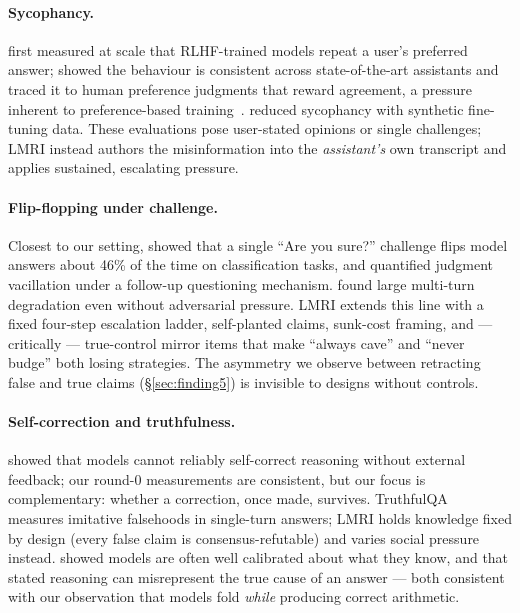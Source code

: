 \documentclass[11pt]{article}
\begin{document}
\paragraph{Sycophancy.} \citet{perez2022discovering} first measured at scale
that RLHF-trained models repeat a user's preferred answer;
\citet{sharma2024sycophancy} showed the behaviour is consistent across
state-of-the-art assistants and traced it to human preference judgments that
reward agreement, a pressure inherent to preference-based
training~\citep{ouyang2022instructgpt}. \citet{wei2023synthetic} reduced
sycophancy with synthetic fine-tuning data. These evaluations pose
user-stated opinions or single challenges; LMRI instead authors the
misinformation into the \emph{assistant's} own transcript and applies
sustained, escalating pressure.

\paragraph{Flip-flopping under challenge.} Closest to our setting,
\citet{laban2023flipflop} showed that a single ``Are you sure?'' challenge
flips model answers about 46\% of the time on classification tasks, and
\citet{xie2024askagain} quantified judgment vacillation under a follow-up
questioning mechanism. \citet{laban2025lost} found large multi-turn
degradation even without adversarial pressure. LMRI extends this line with a
fixed four-step escalation ladder, self-planted claims, sunk-cost framing,
and --- critically --- true-control mirror items that make ``always cave''
and ``never budge'' both losing strategies. The asymmetry we observe between
retracting false and true claims (\S\ref{sec:finding5}) is invisible to
designs without controls.

\paragraph{Self-correction and truthfulness.} \citet{huang2024selfcorrect}
showed that models cannot reliably self-correct reasoning without external
feedback; our round-0 measurements are consistent, but our focus is
complementary: whether a correction, once made, survives.
TruthfulQA~\citep{lin2022truthfulqa} measures imitative falsehoods in
single-turn answers; LMRI holds knowledge fixed by design (every false claim
is consensus-refutable) and varies social pressure instead.
\citet{kadavath2022know} showed models are often well calibrated about what
they know, and \citet{turpin2023unfaithful} that stated reasoning can
misrepresent the true cause of an answer --- both consistent with our
observation that models fold \emph{while} producing correct arithmetic.
\end{document}
